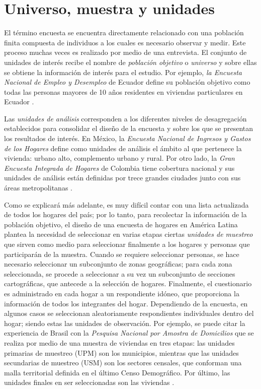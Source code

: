 \documentclass[
  12pt,
  spanish,
]{book}
\begin{document}
\hypertarget{universo-muestra-y-unidades}{%
\section{Universo, muestra y unidades}\label{universo-muestra-y-unidades}}

El término encuesta se encuentra directamente relacionado con una población finita compuesta de individuos a los cuales es necesario observar y medir. Este proceso muchas veces es realizado por medio de una entrevista. El conjunto de unidades de interés recibe el nombre de \emph{población objetivo} o \emph{universo} y sobre ellas se obtiene la información de interés para el estudio. Por ejemplo, \emph{la Encuesta Nacional de Empleo y Desempleo} de Ecuador define su población objetivo como todas las personas mayores de 10 años residentes en viviendas particulares en Ecuador \citep{INEC-EC}.

Las \emph{unidades de análisis} corresponden a los diferentes niveles de desagregación establecidos para consolidar el diseño de la encuesta y sobre los que se presentan los resultados de interés. En México, la \emph{Encuesta Nacional de Ingresos y Gastos de los Hogares} define como unidades de análisis el ámbito al que pertenece la vivienda: urbano alto, complemento urbano y rural. Por otro lado, la \emph{Gran Encuesta Integrada de Hogares} de Colombia tiene cobertura nacional y sus unidades de análisis están definidas por trece grandes ciudades junto con sus áreas metropolitanas \citep{DANE-COL_2017}.

Como se explicará más adelante, es muy difícil contar con una lista actualizada de todos los hogares del país; por lo tanto, para recolectar la información de la población objetivo, el diseño de una encuesta de hogares en América Latina plantea la necesidad de seleccionar en varias etapas ciertas \emph{unidades de muestreo} que sirven como medio para seleccionar finalmente a los hogares y personas que participarán de la muestra. Cuando se requiere seleccionar personas, se hace necesario seleccionar un subconjunto de zonas geográficas; para cada zona seleccionada, se procede a seleccionar a su vez un subconjunto de secciones cartográficas, que antecede a la selección de hogares. Finalmente, el cuestionario es administrado en cada hogar a un respondiente idóneo, que proporciona la información de todos los integrantes del hogar. Dependiendo de la encuesta, en algunos casos se seleccionan aleatoriamente respondientes individuales dentro del hogar; siendo estas las unidades de observación. Por ejemplo, se puede citar la experiencia de Brasil con la \emph{Pesquisa Nacional por Amostra de Domicilios} que se realiza por medio de una muestra de viviendas en tres etapas: las unidades primarias de muestreo (UPM) son los municipios, mientras que las unidades secundarias de muestreo (USM) son los sectores censales, que conforman una malla territorial definida en el último Censo Demográfico. Por último, las unidades finales en ser seleccionadas son las viviendas \citep{IBGE_2014}.
\end{document}
